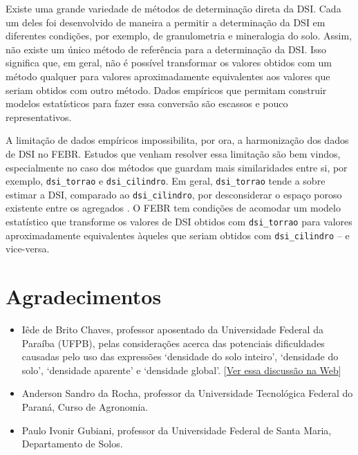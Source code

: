 \documentclass[
]{book}
\providecommand{\tightlist}{%
  \setlength{\itemsep}{0pt}\setlength{\parskip}{0pt}}
\begin{document}
Existe uma grande variedade de métodos de determinação direta da DSI. Cada um deles foi desenvolvido de maneira a permitir a determinação da DSI em diferentes condições, por exemplo, de granulometria e mineralogia do solo. Assim, não existe um único método de referência para a determinação da DSI. Isso significa que, em geral, não é possível transformar os valores obtidos com um método qualquer para valores aproximadamente equivalentes aos valores que seriam obtidos com outro método. Dados empíricos que permitam construir modelos estatísticos para fazer essa conversão são escassos e pouco representativos.

A limitação de dados empíricos impossibilita, por ora, a harmonização dos dados de DSI no FEBR. Estudos que venham resolver essa limitação são bem vindos, especialmente no caso dos métodos que guardam mais similaridades entre si, por exemplo, \texttt{dsi\_torrao} e \texttt{dsi\_cilindro}. Em geral, \texttt{dsi\_torrao} tende a sobre estimar a DSI, comparado ao \texttt{dsi\_cilindro}, por desconsiderar o espaço poroso existente entre os agregados \citep{CasanovaEtAl2016}. O FEBR tem condições de acomodar um modelo estatístico que transforme os valores de DSI obtidos com \texttt{dsi\_torrao} para valores aproximadamente equivalentes àqueles que seriam obtidos com \texttt{dsi\_cilindro} -- e vice-versa.

\hypertarget{agradecimentos}{%
\section*{Agradecimentos}\label{agradecimentos}}

\begin{itemize}
\tightlist
\item
  Iêde de Brito Chaves, professor aposentado da Universidade Federal da Paraíba (UFPB), pelas considerações acerca das potenciais dificuldades causadas pelo uso das expressões `densidade do solo inteiro', `densidade do solo', `densidade aparente' e `densidade global'. {[}\href{https://groups.google.com/d/msgid/soil-mapping/7c8745ca-243d-4d15-97cc-2d00cb5eefdd\%40googlegroups.com}{Ver essa discussão na Web}{]}
\item
  Anderson Sandro da Rocha, professor da Universidade Tecnológica Federal do Paraná, Curso de Agronomia.
\item
  Paulo Ivonir Gubiani, professor da Universidade Federal de Santa Maria, Departamento de Solos.
\end{itemize}
\end{document}
